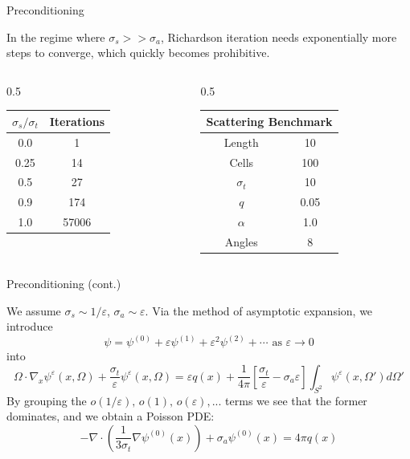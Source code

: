 \documentclass{beamer}
\newcommand{\lt}{\left}
\newcommand{\rt}{\right}
\newcommand{\eps}{\varepsilon}
\theoremstyle{plain}
\theoremstyle{definition}
\begin{document}
\begin{frame}{Preconditioning}

In the regime where $\sigma_s >> \sigma_a$, Richardson iteration needs exponentially more steps to converge, which quickly becomes prohibitive.

\hspace{}

\begin{columns}[onlytextwidth]
    \begin{column}{0.5\textwidth}
        \centering
        \begin{tabular}{c|c}
        \hline
            \multicolumn{1}{c}{$\sigma_s/ \sigma_t$} & \multicolumn{1}{c}{Iterations} 
            \\ \hline
            0.0 & 1\\
            0.25 & 14\\
            0.5 & 27\\
            0.9 & 174\\
            1.0 & 57006\\
            \hline
        \end{tabular}
    \end{column}
    \begin{column}{0.5\textwidth}
        \centering
        \small 
        \begin{tabular}{c|c}
            \hline
            \multicolumn{2}{c}{Scattering Benchmark}\\
            \hline
            Length & 10\\
            Cells & 100 \\
            $\sigma_t$ & 10 \\
            $q$ & 0.05 \\
            \hline
            $\alpha$ & \multicolumn{1}{c}{1.0}  \\
            Angles & \multicolumn{1}{c}{8}  \\
            \hline
        \end{tabular}

    \end{column}
\end{columns}
\end{frame}

\begin{frame}{Preconditioning (cont.)}

We assume $\sigma_s \sim 1/\eps$, $\sigma_a \sim \eps$. Via the method of asymptotic expansion, we introduce 
\[
\psi = \psi^{(0)} + \eps \psi^{(1)} + \eps^2 \psi^{(2)} + \cdots \text{ as } \eps \to 0
\] into \[
\Omega \cdot \nabla_x \psi^\eps(x, \Omega) + \frac{\sigma_t}{\eps} \psi^\eps (x, \Omega) = \eps q(x) + \frac{1}{4\pi} \lt[ \frac{\sigma_t}{\eps} - \sigma_a \eps \rt] \int_{S^2} \psi^\eps(x, \Omega') d\Omega'
\] 
By grouping the $o(1/\eps), \, o(1), \, o(\eps), ...$ terms we see that the former dominates, and we obtain a Poisson PDE: \[
-\nabla \cdot \lt( \frac{1}{3\sigma_t} \nabla \psi^{(0)}(x) \rt) + \sigma_a \psi^{(0)}(x) = 4\pi q(x) 
\]
\end{frame}
\end{document}
